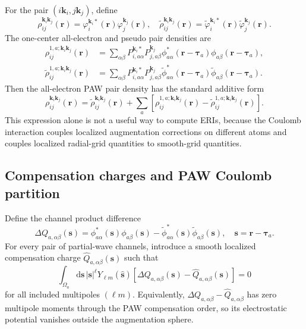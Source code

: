 \documentclass[aps,prb,reprint,superscriptaddress,longbibliography,nofootinbib]{revtex4-2}
\newcommand{\br}{\mathbf r}
\newcommand{\bk}{\mathbf k}
\newcommand{\btau}{\boldsymbol\tau}
\newcommand{\dd}{\mathrm d}
\begin{document}
For the pair \((i\bk_i,j\bk_j)\), define
\begin{equation}
\rho_{ij}^{\bk_i\bk_j}(\br)
=\varphi_i^{\bk_i *}(\br)\varphi_j^{\bk_j}(\br),
\quad
\widetilde\rho_{ij}^{\bk_i\bk_j}(\br)
=\widetilde\varphi_i^{\bk_i *}(\br)\widetilde\varphi_j^{\bk_j}(\br).
\label{eq:paw-pair-def}
\end{equation}
The one-center all-electron and pseudo pair densities are
\begin{subequations}
\begin{align}
\rho_{ij}^{1,a;\bk_i\bk_j}(\br)
&=
\sum_{\alpha\beta}
P_{i,a\alpha}^{\bk_i *}P_{j,a\beta}^{\bk_j}
\phi_{a\alpha}^*(\br-\btau_a)\phi_{a\beta}(\br-\btau_a),
\label{eq:rho-one-ae}\\
\widetilde\rho_{ij}^{1,a;\bk_i\bk_j}(\br)
&=
\sum_{\alpha\beta}
P_{i,a\alpha}^{\bk_i *}P_{j,a\beta}^{\bk_j}
\widetilde\phi_{a\alpha}^*(\br-\btau_a)
\widetilde\phi_{a\beta}(\br-\btau_a).
\label{eq:rho-one-ps}
\end{align}
\end{subequations}
Then the all-electron PAW pair density has the standard additive form
\begin{equation}
\rho_{ij}^{\bk_i\bk_j}(\br)
=
\widetilde\rho_{ij}^{\bk_i\bk_j}(\br)
+
\sum_a
\left[
\rho_{ij}^{1,a;\bk_i\bk_j}(\br)
-
\widetilde\rho_{ij}^{1,a;\bk_i\bk_j}(\br)
\right].
\label{eq:paw-density-decomp}
\end{equation}
This expression alone is not a useful way to compute ERIs, because the Coulomb interaction couples localized augmentation corrections on different atoms and couples localized radial-grid quantities to smooth-grid quantities.

\subsection{Compensation charges and PAW Coulomb partition}

Define the channel product difference
\begin{equation}
\Delta Q_{a,\alpha\beta}(\mathbf s)
=
\phi_{a\alpha}^*(\mathbf s)\phi_{a\beta}(\mathbf s)
-
\widetilde\phi_{a\alpha}^*(\mathbf s)
\widetilde\phi_{a\beta}(\mathbf s),
\quad
\mathbf s=\br-\btau_a.
\label{eq:deltaq}
\end{equation}
For every pair of partial-wave channels, introduce a smooth localized compensation charge \(\widehat Q_{a,\alpha\beta}(\mathbf s)\) such that
\begin{equation}
\int_{\Omega_a}\dd\mathbf s\,
|\mathbf s|^\ell Y_{\ell m}(\widehat{\mathbf s})
\left[\Delta Q_{a,\alpha\beta}(\mathbf s)-\widehat Q_{a,\alpha\beta}(\mathbf s)\right]=0
\label{eq:moment-condition}
\end{equation}
for all included multipoles \((\ell m)\).  Equivalently, \(\Delta Q_{a,\alpha\beta}-\widehat Q_{a,\alpha\beta}\) has zero multipole moments through the PAW compensation order, so its electrostatic potential vanishes outside the augmentation sphere.
\end{document}
